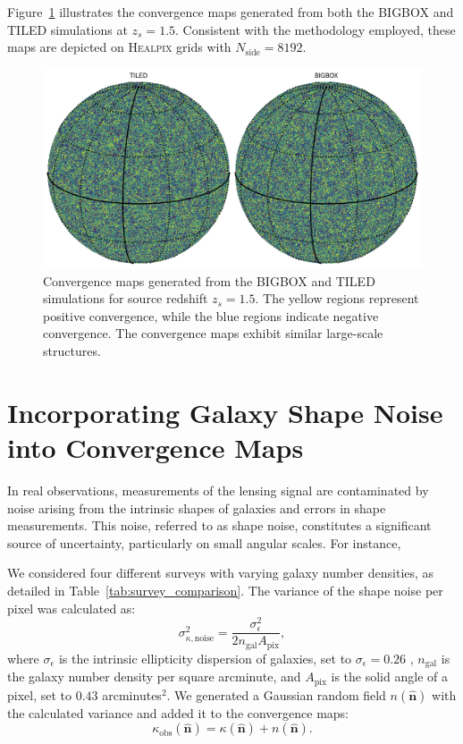 Figure~\ref{fig:convergence_maps} illustrates the convergence maps generated from both the BIGBOX and TILED simulations at $z_s = 1.5$. Consistent with the methodology employed, these maps are depicted on \textsc{Healpix} grids with $N_{\text{side}} = 8192$.

\begin{figure}
    \centering
    \includegraphics[width=\textwidth]{figures/samplemap.png}
    \caption[Convergence maps generated from the BIGBOX and TILED simulations]{Convergence maps generated from the BIGBOX and TILED simulations for source redshift $z_s = 1.5$. The yellow regions represent positive convergence, while the blue regions indicate negative convergence. The convergence maps exhibit similar large-scale structures.} \label{fig:convergence_maps}
\end{figure}

\section{Incorporating Galaxy Shape Noise into Convergence Maps}
In real observations, measurements of the lensing signal are contaminated by noise arising from the intrinsic shapes of galaxies and errors in shape measurements. This noise, referred to as shape noise, constitutes a significant source of uncertainty, particularly on small angular scales. For instance, 

We considered four different surveys with varying galaxy number densities, as detailed in Table~\ref{tab:survey_comparison}.
The variance of the shape noise per pixel was calculated as:
\begin{equation}
    \sigma_{\kappa, \text{noise}}^2 = \frac{\sigma_{\epsilon}^2}{2 n_{\mathrm{gal}} A_{\mathrm{pix}}},
\end{equation}
where $\sigma_{\epsilon}$ is the intrinsic ellipticity dispersion of galaxies, set to $\sigma_{\epsilon} = 0.26$ \citep{2019A&A...627A..59E}, $n_{\mathrm{gal}}$ is the galaxy number density per square arcminute, and $A_{\mathrm{pix}}$ is the solid angle of a pixel, set to $0.43$ arcminutes$^2$.
We generated a Gaussian random field $n(\hat{\mathbf{n}})$ with the calculated variance and added it to the convergence maps:
\begin{equation}
    \kappa_{\mathrm{obs}}(\hat{\mathbf{n}}) = \kappa(\hat{\mathbf{n}}) + n(\hat{\mathbf{n}}).
\end{equation}

